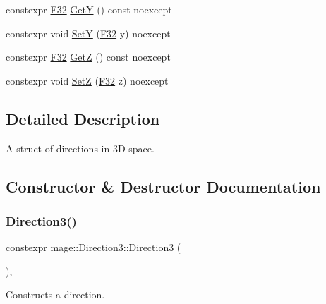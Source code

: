 \begin{DoxyCompactItemize}
\item 
constexpr \mbox{\hyperlink{namespacemage_aa97e833b45f06d60a0a9c4fc22ae02c0}{F32}} \mbox{\hyperlink{structmage_1_1_direction3_a995bc58846a268b63f6e7fdd678420cd}{GetY}} () const noexcept
\item 
constexpr void \mbox{\hyperlink{structmage_1_1_direction3_a4ac25624a33e1eee6724f0b411737d2c}{SetY}} (\mbox{\hyperlink{namespacemage_aa97e833b45f06d60a0a9c4fc22ae02c0}{F32}} y) noexcept
\item 
constexpr \mbox{\hyperlink{namespacemage_aa97e833b45f06d60a0a9c4fc22ae02c0}{F32}} \mbox{\hyperlink{structmage_1_1_direction3_a6ee9bc60c92c37c6ff7e1b432bf191c7}{GetZ}} () const noexcept
\item 
constexpr void \mbox{\hyperlink{structmage_1_1_direction3_a26d3ef84f5c7429f325871c5d59e39e7}{SetZ}} (\mbox{\hyperlink{namespacemage_aa97e833b45f06d60a0a9c4fc22ae02c0}{F32}} z) noexcept
\end{DoxyCompactItemize}


\subsection{Detailed Description}
A struct of directions in 3D space. 

\subsection{Constructor \& Destructor Documentation}
\mbox{\label{structmage_1_1_direction3_a64dd4745147f5fd39f710e8b9591074a}} 
\subsubsection{\texorpdfstring{Direction3()}{Direction3()}\hspace{0.1cm}{\footnotesize\ttfamily [1/5]}}
{\footnotesize\ttfamily constexpr mage\+::\+Direction3\+::\+Direction3 (\begin{DoxyParamCaption}{ }\end{DoxyParamCaption})\hspace{0.3cm}{\ttfamily [default]}, {\ttfamily [noexcept]}}

Constructs a direction. \mbox{\label{structmage_1_1_direction3_a880d7413dc6f3742b53a089b870018c7}} 
